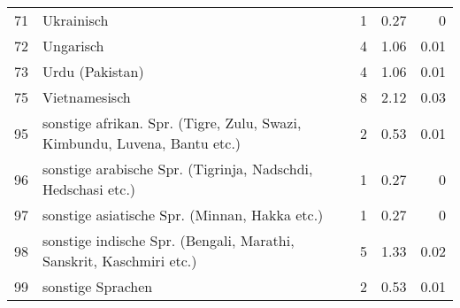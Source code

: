 \begin{longtable}{lXrrr}
        71 & \multicolumn{1}{X}{Ukrainisch} & %
          \num{1} &
          \num[round-mode=places,round-precision=2]{0,27} &
          \num[round-mode=places,round-precision=2]{0} \\

        72 & \multicolumn{1}{X}{Ungarisch} & %
          \num{4} &
          \num[round-mode=places,round-precision=2]{1,06} &
          \num[round-mode=places,round-precision=2]{0,01} \\

        73 & \multicolumn{1}{X}{Urdu (Pakistan)} & %
          \num{4} &
          \num[round-mode=places,round-precision=2]{1,06} &
          \num[round-mode=places,round-precision=2]{0,01} \\

        75 & \multicolumn{1}{X}{Vietnamesisch} & %
          \num{8} &
          \num[round-mode=places,round-precision=2]{2,12} &
          \num[round-mode=places,round-precision=2]{0,03} \\

        95 & \multicolumn{1}{X}{sonstige afrikan. Spr. (Tigre, Zulu, Swazi, Kimbundu, Luvena, Bantu etc.)} & %
          \num{2} &
          \num[round-mode=places,round-precision=2]{0,53} &
          \num[round-mode=places,round-precision=2]{0,01} \\

        96 & \multicolumn{1}{X}{sonstige arabische Spr. (Tigrinja, Nadschdi, Hedschasi etc.)} & %
          \num{1} &
          \num[round-mode=places,round-precision=2]{0,27} &
          \num[round-mode=places,round-precision=2]{0} \\

        97 & \multicolumn{1}{X}{sonstige asiatische Spr. (Minnan, Hakka etc.)} & %
          \num{1} &
          \num[round-mode=places,round-precision=2]{0,27} &
          \num[round-mode=places,round-precision=2]{0} \\

        98 & \multicolumn{1}{X}{sonstige indische Spr. (Bengali, Marathi, Sanskrit, Kaschmiri etc.)} & %
          \num{5} &
          \num[round-mode=places,round-precision=2]{1,33} &
          \num[round-mode=places,round-precision=2]{0,02} \\

        99 & \multicolumn{1}{X}{sonstige Sprachen} & %
          \num{2} &
          \num[round-mode=places,round-precision=2]{0,53} &
          \num[round-mode=places,round-precision=2]{0,01} \\


\end{longtable}
